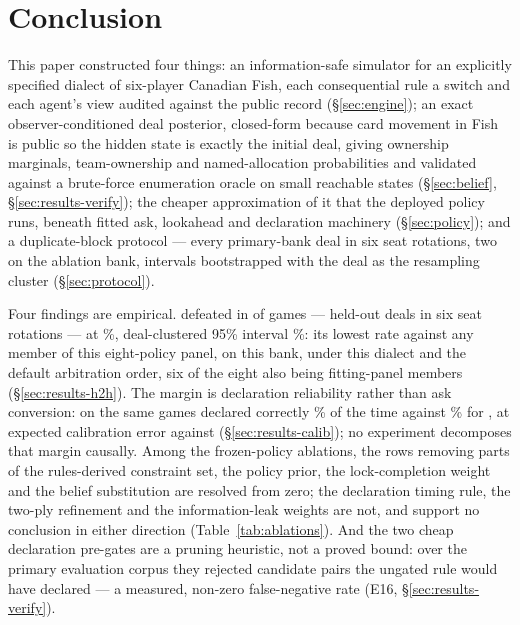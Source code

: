 \section{Conclusion}
\label{sec:conclusion}

This paper constructed four things: an information-safe simulator for an
explicitly specified dialect of six-player Canadian Fish, each consequential
rule a switch and each agent's view audited against the public record
(\S\ref{sec:engine}); an exact observer-conditioned deal posterior, closed-form
because card movement in Fish is public so the hidden state is exactly the
initial deal, giving ownership marginals, team-ownership and named-allocation
probabilities and validated against a brute-force enumeration oracle on small
reachable states (\S\ref{sec:belief}, \S\ref{sec:results-verify}); the cheaper
approximation of it that the deployed \vfast{} policy runs, beneath fitted ask,
lookahead and declaration machinery (\S\ref{sec:policy}); and a duplicate-block
protocol --- every primary-bank deal in six seat rotations, two on the ablation
bank, intervals bootstrapped with the deal as the resampling cluster
(\S\ref{sec:protocol}).

Four findings are empirical. \vfast{} defeated \vthree{} in \numVsVthreeWins{}
of \numHtHGames{} games --- \numHtHDeals{} held-out deals in six seat rotations
--- at \numVsVthree\%, deal-clustered 95\% interval \numVsVthreeCI\%: its lowest
rate against any member of this eight-policy panel, on this bank, under this
dialect and the default arbitration order, six of the eight also being
fitting-panel members (\S\ref{sec:results-h2h}). The margin is declaration
reliability rather than ask conversion: on the same games \vfast{} declared
correctly \numVsVthreeDeclAcc\% of the time against \numVthreeDeclAccSame\% for
\vthree{}, at expected calibration error \numDeclECE{} against \numVthreeDeclECE{}
(\S\ref{sec:results-calib}); no experiment decomposes that margin causally.
Among the frozen-policy ablations, the rows removing parts of the rules-derived
constraint set, the policy prior, the lock-completion weight and the \vblock{}
belief substitution are resolved from zero; the declaration timing rule, the
two-ply refinement and the information-leak weights are not, and support no
conclusion in either direction (Table~\ref{tab:ablations}). And the two cheap
declaration pre-gates are a pruning heuristic, not a proved bound: over the
primary evaluation corpus they rejected \numGateFalseNeg{} candidate pairs the
ungated rule would have declared --- a measured, non-zero false-negative rate
(E16, \S\ref{sec:results-verify}).

